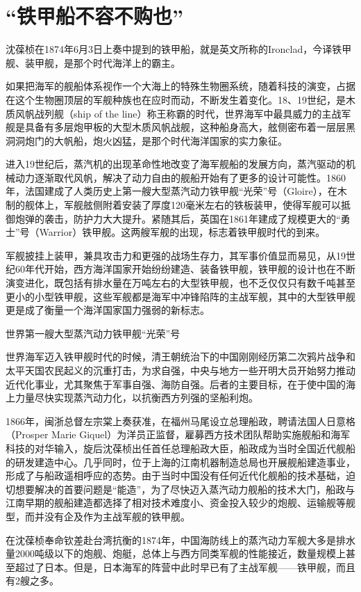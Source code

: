 \documentclass[12pt,UTF8]{ctexbook}
\begin{document}
\section{“铁甲船不容不购也”}

沈葆桢在1874年6月3日上奏中提到的铁甲船，就是英文所称的Ironclad，今译铁甲舰、装甲舰，是那个时代海洋上的霸主。

如果把海军的舰船体系视作一个大海上的特殊生物圈系统，随着科技的演变，占据在这个生物圈顶层的军舰种族也在应时而动，不断发生着变化。18、19世纪，是木质风帆战列舰（ship of the line）称王称霸的时代，世界海军中最具威力的主战军舰是具备有多层炮甲板的大型木质风帆战舰，这种船身高大，舷侧密布着一层层黑洞洞炮门的大帆船，炮火凶猛，是那个时代海洋国家的实力象征。

进入19世纪后，蒸汽机的出现革命性地改变了海军舰船的发展方向，蒸汽驱动的机械动力逐渐取代风帆，解决了动力自由的舰船开始有了更多的设计可能性。1860年，法国建成了人类历史上第一艘大型蒸汽动力铁甲舰“光荣”号（Gloire），在木制的舰体上，军舰舷侧附着安装了厚度120毫米左右的铁板装甲，使得军舰可以抵御炮弹的袭击，防护力大大提升。紧随其后，英国在1861年建成了规模更大的“勇士”号（Warrior）铁甲舰。这两艘军舰的出现，标志着铁甲舰时代的到来。

军舰披挂上装甲，兼具攻击力和更强的战场生存力，其军事价值显而易见，从19世纪60年代开始，西方海洋国家开始纷纷建造、装备铁甲舰，铁甲舰的设计也在不断演变进化，既包括有排水量在万吨左右的大型铁甲舰，也不乏仅仅只有数千吨甚至更小的小型铁甲舰，这些军舰都是海军中冲锋陷阵的主战军舰，其中的大型铁甲舰更是成了衡量一个海洋国家国力强弱的新标志。

世界第一艘大型蒸汽动力铁甲舰“光荣”号

世界海军迈入铁甲舰时代的时候，清王朝统治下的中国刚刚经历第二次鸦片战争和太平天国农民起义的沉重打击，为求自强，中央与地方一些开明大员开始努力推动近代化事业，尤其聚焦于军事自强、海防自强。后者的主要目标，在于使中国的海上力量尽快实现蒸汽动力化，以抗衡西方列强的坚船利炮。

1866年，闽浙总督左宗棠上奏获准，在福州马尾设立总理船政，聘请法国人日意格（Prosper Marie Giquel）为洋员正监督，雇募西方技术团队帮助实施舰船和海军科技的对华输入，旋后沈葆桢出任首任总理船政大臣，船政成为当时全国近代舰船的研发建造中心。几乎同时，位于上海的江南机器制造总局也开展舰船建造事业，形成了与船政遥相呼应的态势。由于当时中国没有任何近代化舰船的技术基础，迫切想要解决的首要问题是“能造”，为了尽快迈入蒸汽动力舰船的技术大门，船政与江南早期的舰船建造都选择了相对技术难度小、资金投入较少的炮舰、运输舰等舰型，而并没有企及作为主战军舰的铁甲舰。

在沈葆桢奉命钦差赴台湾抗衡的1874年，中国海防线上的蒸汽动力军舰大多是排水量2000吨级以下的炮舰、炮艇，总体上与西方同类军舰的性能接近，数量规模上甚至超过了日本。但是，日本海军的阵营中此时早已有了主战军舰——铁甲舰，而且有2艘之多。
\end{document}
